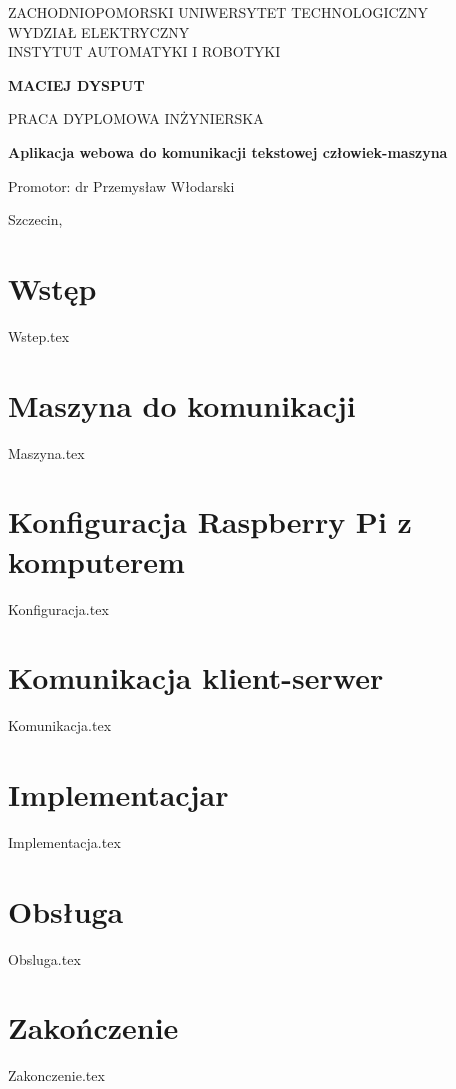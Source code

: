\documentclass[12pt,a4paper,leqno,oneside,titlepage]{mwrep}
\begin{document}
\begin{titlepage}
\begin{center}

{\large ZACHODNIOPOMORSKI UNIWERSYTET TECHNOLOGICZNY\\ WYDZIAŁ ELEKTRYCZNY\\ INSTYTUT AUTOMATYKI I ROBOTYKI\par}
\end{center}
\vspace{1.5cm plus 1fill}
\begin{center}
{\bf \Large MACIEJ DYSPUT\par}
\end{center}
\vspace{1.5cm plus 1mm minus 2mm}
\begin{center}
{\large PRACA DYPLOMOWA INŻYNIERSKA\par}
\end{center}
\vspace{1.5cm plus 1mm minus 2mm}
\begin{center}
{\huge\textbf{Aplikacja webowa do komunikacji tekstowej człowiek-maszyna}\par}
\vspace{1.5cm plus 1.5fill}
\begin{flushright}
{\large Promotor: dr Przemysław Włodarski}
\end{flushright}
\vspace{4cm plus .1fill}
{\large Szczecin,\par}
\end{center}
\end{titlepage}
\tableofcontents
\chapter{Wstęp}
{Wstep.tex}

\chapter{Maszyna do komunikacji}
{Maszyna.tex}

\chapter{Konfiguracja Raspberry Pi z komputerem}
{Konfiguracja.tex}

\chapter{Komunikacja klient-serwer}
{Komunikacja.tex}

\chapter{Implementacjar}
{Implementacja.tex}

\chapter{Obsługa}
{Obsluga.tex}

\chapter{Zakończenie}
{Zakonczenie.tex}
\end{document}
